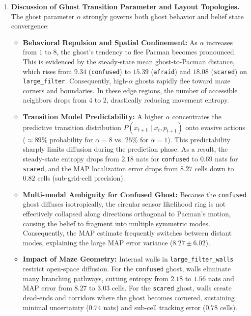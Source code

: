 \documentclass{article}
\begin{document}
\begin{enumerate}[label=\alph*.,leftmargin=*]
    All configurations demonstrate rapid convergence from the initial uniform prior within approximately 30--40 steps, stabilizing into stationary regimes with bounded variance.

    \item \textbf{Discussion of Ghost Transition Parameter and Layout Topologies.}
    The ghost parameter $\alpha$ strongly governs both ghost behavior and belief state convergence:
    \begin{itemize}[leftmargin=*]
        \item \textbf{Behavioral Repulsion and Spatial Confinement:} As $\alpha$ increases from $1$ to $8$, the ghost's tendency to flee Pacman becomes pronounced. This is evidenced by the steady-state mean ghost-to-Pacman distance, which rises from $9.34$ (\texttt{confused}) to $15.39$ (\texttt{afraid}) and $18.08$ (\texttt{scared}) on \texttt{large\_filter}. Consequently, high-$\alpha$ ghosts rapidly flee toward maze corners and boundaries. In these edge regions, the number of accessible neighbors drops from 4 to 2, drastically reducing movement entropy.
        \item \textbf{Transition Model Predictability:} A higher $\alpha$ concentrates the predictive transition distribution $P(x_{t+1} \mid x_t, p_{t+1})$ onto evasive actions ($\approx 89\%$ probability for $\alpha=8$ vs. $25\%$ for $\alpha=1$). This predictability sharply limits diffusion during the prediction phase. As a result, the steady-state entropy drops from $2.18$ nats for \texttt{confused} to $0.69$ nats for \texttt{scared}, and the MAP localization error drops from $8.27$ cells down to $0.82$ cells (sub-grid-cell precision).
        \item \textbf{Multi-modal Ambiguity for Confused Ghost:} Because the \texttt{confused} ghost diffuses isotropically, the circular sensor likelihood ring is not effectively collapsed along directions orthogonal to Pacman's motion, causing the belief to fragment into multiple symmetric modes. Consequently, the MAP estimate frequently switches between distant modes, explaining the large MAP error variance ($8.27 \pm 6.02$).
        \item \textbf{Impact of Maze Geometry:} Internal walls in \texttt{large\_filter\_walls} restrict open-space diffusion. For the \texttt{confused} ghost, walls eliminate many branching pathways, cutting entropy from $2.18$ to $1.56$ nats and MAP error from $8.27$ to $3.03$ cells. For the \texttt{scared} ghost, walls create dead-ends and corridors where the ghost becomes cornered, sustaining minimal uncertainty ($0.74$ nats) and sub-cell tracking error ($0.78$ cells).
    \end{itemize}


\end{enumerate}
\end{document}
